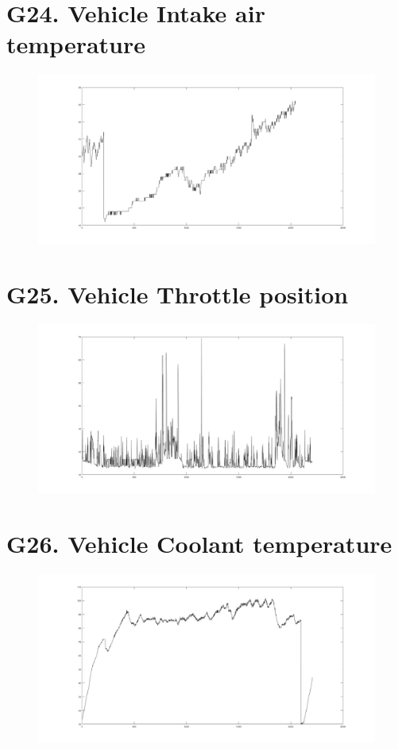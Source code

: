 \documentclass{article}
\begin{document}
\section*{G24. Vehicle Intake air temperature }
\begin{figure}[h!]
 \begin{center}
 \advance\leftskip-6cm
  \includegraphics[width=230mm,scale=0.7]{g24s2.jpg}
\end{center}
\end{figure}
\newpage
\section*{G25. Vehicle Throttle position }
\begin{figure}[h!]
 \begin{center}
 \advance\leftskip-6cm
  \includegraphics[width=230mm,scale=0.7]{g25s2.jpg}
\end{center}
\end{figure}
\newpage
\section*{G26. Vehicle Coolant temperature }
\begin{figure}[h!]
 \begin{center}
 \advance\leftskip-6cm
  \includegraphics[width=230mm,scale=0.7]{g26s2.jpg}
\end{center}
\end{figure}
\end{document}
